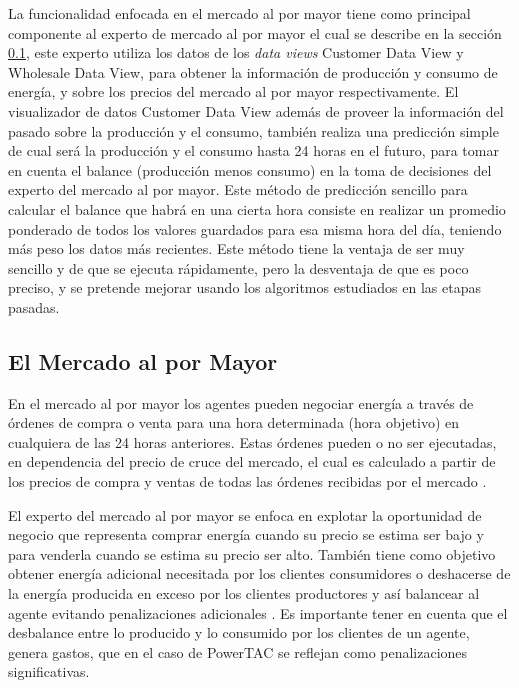 La funcionalidad enfocada en el mercado al por mayor tiene como principal componente al
experto de mercado al por mayor el cual se describe en la sección \ref{subsec:mercadoAlPorMayor}, este experto utiliza los datos de los \textit{data views} Customer Data View y  Wholesale Data View, para obtener la información de producción y consumo de energía, y sobre los precios del mercado al por mayor respectivamente. El visualizador de datos Customer Data View además de proveer la información del pasado sobre la producción y el consumo, también realiza una predicción simple de cual será la producción y el consumo hasta 24 horas en el futuro, para tomar en cuenta el balance (producción menos consumo) en la toma de decisiones del experto del mercado al por mayor. 
Este método de predicción sencillo para calcular el balance que habrá en una cierta hora
consiste en realizar un promedio ponderado de todos los valores guardados para esa misma hora del día, teniendo más peso los datos más recientes. Este método tiene la ventaja de ser muy sencillo y de que se ejecuta rápidamente, pero la desventaja de que es poco preciso,  y se pretende mejorar usando los algoritmos estudiados en las etapas pasadas.

\subsection{El Mercado al por Mayor} \label{subsec:mercadoAlPorMayor}
En el mercado al por mayor los agentes pueden negociar energía a través de órdenes de compra o venta para una hora determinada (hora objetivo) en cualquiera de las 24 horas anteriores. Estas órdenes pueden o no ser ejecutadas, en dependencia del precio de cruce del mercado, el cual es calculado a partir de los precios de compra y ventas de todas las órdenes recibidas por el mercado \cite{WKetterJCollinsyMdWeerdtThe2016PowerTAC}.

El experto del mercado al por mayor se enfoca en explotar la oportunidad de negocio que representa comprar energía cuando su precio se estima ser bajo y para venderla cuando se estima su precio ser alto. También tiene como objetivo obtener energía adicional necesitada por los clientes consumidores o deshacerse de la energía producida en exceso por los clientes productores y así balancear al agente evitando penalizaciones adicionales \cite{Entregable4CemieEolico}. Es importante tener en cuenta que el desbalance entre lo producido y lo consumido por los clientes de un agente, genera gastos, que en el caso de PowerTAC se reflejan como penalizaciones significativas. 

